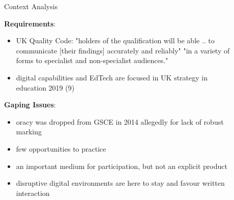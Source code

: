 \documentclass[final]{beamer}
\newlength{\sepwid}
\newlength{\onecolwid}
\newlength{\twocolwid}
\begin{document}
\begin{frame}[t]
\begin{columns}[t]
\begin{column}{\onecolwid}
\end{column} %

\begin{column}{\sepwid}\end{column} %

\begin{column}{\twocolwid} %

\begin{columns}[t,totalwidth=\twocolwid] %

\begin{column}{\onecolwid}\vspace{-.6in} %


\begin{block}{Context Analysis}

\textbf{\textcolor{dgreen}{Requirements}}:
\begin{itemize}
\item UK Quality Code: "holders of the qualification will be able .. to communicate [their findings] accurately and reliably" "in a variety of forms to specialist and non-specialist audiences."
\item digital capabilities and EdTech are focused in UK strategy in education 2019 (9)
\end{itemize}

\textbf{\textcolor{dgreen}{Gaping Issues}}:
\begin{itemize}
\item oracy was dropped from GSCE in 2014 allegedly for lack of robust marking
\item few opportunities to practice
\item an important medium for participation, but not an explicit product
\item disruptive digital environments are here to stay and favour written interaction

\end{itemize}

\end{block}



\end{column}
\end{columns}
\end{column}
\end{columns}
\end{frame}
\end{document}
